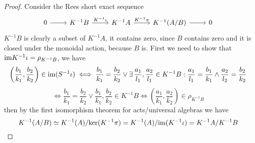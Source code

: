\begin{proof}[Proof]
    Consider the Rees short exact sequence 
    \[\begin{tikzcd}
        0 & {K^{-1}B} & {K^{-1}A} & {K^{-1}(A/B)} & 0
        \arrow[from=1-1, to=1-2]
        \arrow["{K^{-1}\iota}", from=1-2, to=1-3]
        \arrow["{K^{-1}\pi}", from=1-3, to=1-4]
        \arrow[from=1-4, to=1-5]
    \end{tikzcd}\]
    $K^{-1}B$ is clearly a subset of $K^{-1}A$, it contains zero, since $B$ contains zero and 
    it is closed under the monoidal action, because $B$ is.
    First we need to show that $\text{im} K^{-1}\iota = \rho_{K^{-1}B}$, we have 
    \[
    \left(\frac{b_1}{k_1},\frac{b_2}{k_2}\right)\in\text{im}(S^{-1}\iota) \iff \frac{b_1}{k_1}=\frac{b_2}{k_2}\lor\exists\,\frac{a_1}{l_1},\frac{a_2}{l_1}\in K^{-1}B :
    \frac{a_1}{l_1}=\frac{b_1}{k_1}\land\frac{a_2}{l_2}=\frac{b_2}{k_2}
    \]
    \[
        \iff \frac{b_1}{k_1}=\frac{b_2}{k_2}\lor \frac{b_1}{k_1},\frac{b_2}{k_2}\in K^{-1}B \iff \left(\frac{a_1}{k_1},\frac{a_2}{k_2}\right)\in\rho_{K^{-1}B}
    \]
    then by the first isomorphism theorem for acts/universal algebras \cite[Theorem~4.21]{Kilp00} we have 
    \[
    K^{-1}(A/B)\simeq K^{-1}(A)/\mathrm{ker}(K^{-1}\pi) = K^{-1}(A)/\text{im}(K^{-1}\iota) = K^{-1}A/K^{-1}B
    \]
\end{proof}
